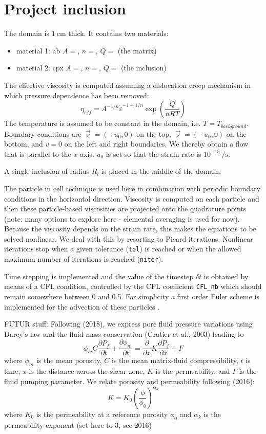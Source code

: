 \newpage
\section*{Project inclusion}

The domain is $1~\si{\cm}$ thick. It contains two materials:
\begin{itemize}
\item material 1: ab $A=$, $n=$, $Q=$ (the matrix)
\item material 2: cpx $A=$, $n=$, $Q=$ (the inclusion)
\end{itemize}
The effective viscosity is computed assuming a dislocation creep mechanism
in which pressure dependence has been removed:
\[
\eta_{eff} = A^{-1/n} \dot{\varepsilon}^{-1+1/n} \exp\left( \frac{Q}{nRT}\right)
\]
The temperature is assumed to be constant in the domain, i.e. $T=T_{background}$.
Boundary conditions are $\vec{\upnu}=(+u_0,0)$ on the top, $\vec{\upnu}=(-u_0,0)$ on the 
bottom, and $v=0$ on the left and right boundaries. We thereby obtain a flow 
that is parallel to the $x$-axis. $u_0$ is set so that the strain rate is $10^{-15}~\si{\per\second}$.

A single inclusion of radius $R_i$ is placed in the middle of the domain.

The particle in cell technique is used here in combination with 
periodic boundary conditions in the horizontal direction.
Viscosity is computed on each particle and then these particle-based 
viscosities are projected onto the quadrature points (note: many options to 
explore here - elemental averaging is used for now). 
Because the viscosity depends on the strain rate, this makes the equations 
to be solved nonlinear. We deal with this by resorting to Picard iterations. 
Nonlinear iterations stop when a given tolerance ({\tt tol}) is reached or when the 
allowed maximum number of iterations is reached ({\tt niter}).

Time stepping is implemented and the value of the timestep $\delta t$ is obtained 
by means of a CFL condition, controlled by the CFL coefficient {\tt CFL\_nb} which 
should remain somewhere between 0 and 0.5. For simplicity a first order Euler scheme is implemented 
for the advection of these particles . 

\vspace{1cm}

FUTUR stuff:
Following \textcite{begu18} (2018), we 
express pore fluid pressure variations using Darcy’s law and the fluid mass 
conservation (Gratier et al., 2003) leading to 
\[
\phi_m C \frac{\partial P_f}{\partial t}
+\frac{\partial \phi_m}{\partial t}
= 
\frac{\partial}{\partial x} K \frac{\partial P_f}{\partial x} + F
\]
where $\phi_m$ is the mean porosity, $C$ is the mean matrix-fluid compressibility, 
$t$ is time, $x$ is the distance across the
shear zone, $K$ is the permeability, and $F$ is the fluid pumping parameter. 
We relate porosity and permeability following \textcite{skre16} (2016):
\[
K = K_0 \left( \frac{\phi}{\phi_0} \right)^{\alpha_k}
\]
where $K_0$ is the permeability at a reference porosity $\phi_0$ 
and $\alpha_k$ is the permeability exponent
(set here to 3, see \textcite{skre16} 2016)

